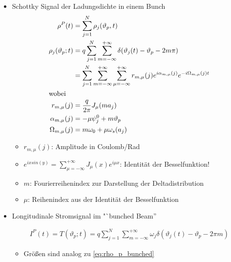 \documentclass[12pt]{article}%
\renewcommand{\theta}{\vartheta}
\begin{document}
\begin{itemize}
\item Schottky Signal der Ladungsdichte in einem Bunch
\begin{subequations}
\begin{align}
 	\label{eq:rho_p_bunched}
 	\rho^P(t) &= \sum_{j=1}^{N} \rho_j(\theta_p, t) \\ \rho_j(\theta_p;t)&=q\sum_{j=1}^{N}\sum_{m=-\infty}^{+\infty}  \delta(\theta_j(t) - \theta_p - 2m\pi) \\
 	&= \sum_{j=1}^{N}\sum_{m=-\infty}^{+\infty}\sum_{\mu = - \infty}^{+\infty} r_{m,\mu}(j) e^{i \alpha_{m,\mu}(j)}e^{-i\Omega_{m,\mu}(j)t} \\
\intertext{wobei}
\nonumber r_{m,\mu}(j) &= \frac{q}{2\pi} J_\mu(ma_j) \\
\nonumber \alpha_{m,\mu}(j) &= -\mu \psi_{j}^0+m\theta_p \\
\nonumber \Omega_{m,\mu}(j) &=m\omega_{0} +\mu \omega_s (a_j)
\end{align}
\end{subequations}

\begin{itemize}
	\item $r_{m,\mu}(j)$: Amplitude in Coulomb/Rad

	\item $e^{ix sin(y)}=\sum_{\mu= - \infty}^{+\infty} J_{\mu}(x)e^{i\mu x}$: Identität der Besselfunktion!
	
	\item $m$: Fourierreihenindex zur Darstellung der Deltadistribution
	\item $\mu$: Reihenindex aus der Identität der Besselfunktion
	
	
\end{itemize}
\end{itemize}

\begin{itemize}
	\item Longitudinale Stromsignal im "`bunched Beam''
	
	\begin{align}
		I^P(t) = T(\theta_p;t) = q \sum_{j = 1}^{N} \sum_{m=-\infty}^{+\infty} \omega_j \delta(\theta_j(t)- \theta_p - 2\pi m)
	\end{align}
\begin{itemize}
	\item Größen sind analog zu \eqref{eq:rho_p_bunched} 
	
\end{itemize}
\end{itemize}
\end{document}
